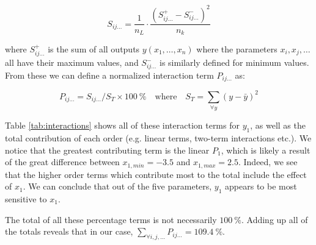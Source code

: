 \begin{equation}
	S_{ij\dots} = \frac{1}{n_L} \cdot \frac{(S_{ij\dots}^+ - S_{ij\dots}^-)^2}{n_k}
\end{equation}

where $S_{ij\dots}^+$ is the sum of all outputs $y(x_1, \dots, x_n)$ where the parameters $x_i, x_j, \dots$ all have their maximum values, and $S_{ij\dots}^-$ is similarly defined for minimum values. From these we can define a normalized interaction term $P_{ij\dots}$ as:

\begin{equation}
	P_{ij\dots} = S_{ij\dots} / S_T \times 100\ \% \quad \text{where} \quad S_T = \sum_{\forall y} (y - \bar{y})^2
\end{equation}

Table \ref{tab:interactions} shows all of these interaction terms for $y_1$, as well as the total contribution of each order (e.g. linear terms, two-term interactions etc.). We notice that the greatest contributing term is the linear $P_1$, which is likely a result of the great difference between $x_{1,min} = -3.5$ and $x_{1,max} = 2.5$. Indeed, we see that the higher order terms which contribute most to the total include the effect of $x_1$. We can conclude that out of the five parameters, $y_1$ appears to be most sensitive to $x_1$.

The total of all these percentage terms is not necessarily $100\ \%$. Adding up all of the totals reveals that in our case, $\sum_{\forall i,j,\dots} P_{ij\dots} = 109.4\ \%$.

